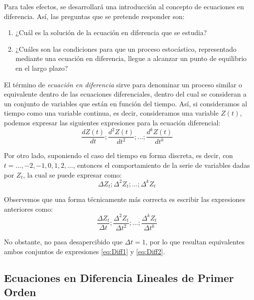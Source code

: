 \documentclass[
]{book}
\begin{document}
Para tales efectos, se desarrollará una introducción al concepto de ecuaciones en diferencia. Así, las preguntas que se pretende responder son:

\begin{enumerate}
\def\labelenumi{\arabic{enumi}.}
\item
  ¿Cuál es la solución de la ecuación en diferencia que se estudia?
\item
  ¿Cuáles son las condiciones para que un proceso estocástico, representado mediante una ecuación en diferencia, llegue a alcanzar un punto de equilibrio en el largo plazo?
\end{enumerate}

El término de \emph{ecuación en diferencia} sirve para denominar un proceso similar o equivalente dentro de las ecuaciones diferenciales, dentro del cual se consideran a un conjunto de variables que están en función del tiempo. Así, si consideramos al tiempo como una variable continua, es decir, consideramos una variable \(Z(t)\), podemos expresar las siguientes expresiones para la ecuación diferencial:
\begin{equation}
    \frac{dZ(t)}{dt}; \frac{d^2Z(t)}{dt^2}; \ldots; \frac{d^kZ(t)}{dt^k}
        \label{eq:eqDiff}
\end{equation}

Por otro lado, suponiendo el caso del tiempo en forma discreta, es decir, con \(t = \ldots, -2, -1, 0, 1, 2, \ldots\), entonces el comportamiento de la serie de variables dadas por \(Z_t\), la cual se puede expresar como:
\begin{equation}
    \Delta Z_t; \Delta^2 Z_t; \ldots; \Delta^k Z_t
    \label{eq:Diff1}
\end{equation}

Observemos que una forma técnicamente más correcta es escribir las expresiones anteriores como:
\begin{equation}
    \frac{\Delta Z_t}{\Delta t}; \frac{\Delta^2 Z_t}{\Delta t^2}; \ldots; \frac{\Delta^k Z_t}{\Delta t^k}
    \label{eq:Diff2}
\end{equation}

No obstante, no pasa desapercibido que \(\Delta t = 1\), por lo que resultan equivalentes ambos conjuntos de expresiones \eqref{eq:Diff1} y \eqref{eq:Diff2}.

\hypertarget{ecuaciones-en-diferencia-lineales-de-primer-orden}{%
\subsection{Ecuaciones en Diferencia Lineales de Primer Orden}\label{ecuaciones-en-diferencia-lineales-de-primer-orden}}
\end{document}
